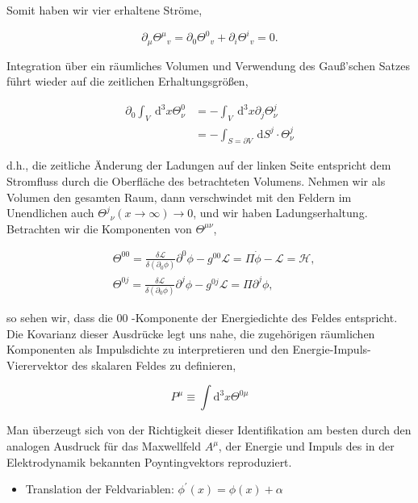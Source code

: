 \documentclass[10pt, letterpaper]{article}
\begin{document}
Somit haben wir vier erhaltene Ströme,

$$
\partial_{\mu} \Theta^{\mu}{ }_{v}=\partial_{0} \Theta^{0}{ }_{v}+\partial_{i} \Theta^{i}{ }_{v}=0 .
$$

Integration über ein räumliches Volumen und Verwendung des Gauß'schen Satzes führt wieder auf die zeitlichen Erhaltungsgrößen,

$$
\begin{aligned}
\partial_{0} \int_{V} \mathrm{~d}^{3} x \Theta_{\nu}^{0} & =-\int_{V} \mathrm{~d}^{3} x \partial_{j} \Theta_{\nu}^{j} \\
& =-\int_{S=\partial V} \mathrm{~d} S^{j} \cdot \Theta_{\nu}^{j}
\end{aligned}
$$

d.h., die zeitliche Änderung der Ladungen auf der linken Seite entspricht dem Stromfluss durch die Oberfläche des betrachteten Volumens. Nehmen wir als Volumen den gesamten Raum, dann verschwindet mit den Feldern im Unendlichen auch $\Theta^{j}{ }_{\nu}(x \rightarrow \infty) \rightarrow 0$, und wir haben Ladungserhaltung. Betrachten wir die Komponenten von $\Theta^{\mu \nu}$,

$$
\begin{aligned}
& \Theta^{00}=\frac{\delta \mathscr{L}}{\delta\left(\partial_{0} \phi\right)} \partial^{0} \phi-g^{00} \mathscr{L}=\Pi \dot{\phi}-\mathscr{L}=\mathscr{H}, \\
& \Theta^{0 j}=\frac{\delta \mathscr{L}}{\delta\left(\partial_{0} \phi\right)} \partial^{j} \phi-g^{0 j} \mathscr{L}=\Pi \partial^{j} \phi,
\end{aligned}
$$

so sehen wir, dass die 00 -Komponente der Energiedichte des Feldes entspricht. Die Kovarianz dieser Ausdrücke legt uns nahe, die zugehörigen räumlichen Komponenten als Impulsdichte zu interpretieren und den Energie-Impuls-Vierervektor des skalaren Feldes zu definieren,

$$
P^{\mu} \equiv \int \mathrm{d}^{3} x \Theta^{0 \mu}
$$

Man überzeugt sich von der Richtigkeit dieser Identifikation am besten durch den analogen Ausdruck für das Maxwellfeld $A^{\mu}$, der Energie und Impuls des in der Elektrodynamik bekannten Poyntingvektors reproduziert.

\begin{itemize}
  \item Translation der Feldvariablen: $\phi^{\prime}(x)=\phi(x)+\alpha$
\end{itemize}
\end{document}
